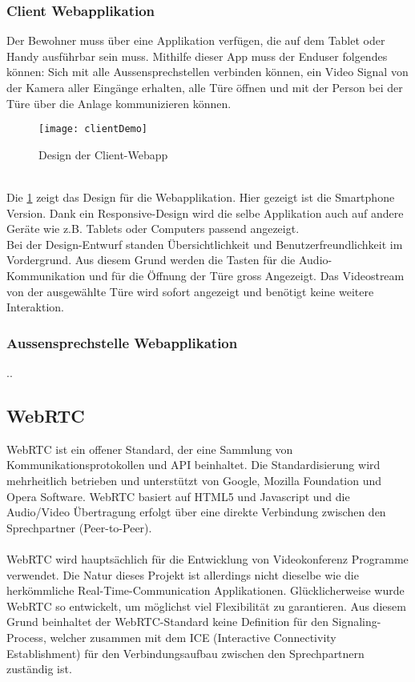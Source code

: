 \subsubsection{Client Webapplikation}
Der Bewohner muss über eine Applikation verfügen, die auf dem Tablet oder Handy ausführbar sein muss. Mithilfe dieser App muss der Enduser folgendes können: Sich mit alle Aussensprechstellen verbinden können, ein Video Signal von der Kamera aller Eingänge erhalten, alle Türe öffnen und mit der Person bei der Türe über die Anlage kommunizieren können.
\\
\begin{figure}[htb!]
	\begin{center}
		\texttt{[image: clientDemo]}
		\caption[Design der Client-Webapp]{Design der Client-Webapp}
		\label{fig:clientDemo}
	\end{center}
\end{figure}
\\
Die \cref{fig:clientDemo} zeigt das Design für die Webapplikation. Hier gezeigt ist die Smartphone Version. Dank ein Responsive-Design wird die selbe Applikation auch auf andere Geräte wie z.B. Tablets oder Computers passend angezeigt.
\\ 
Bei der Design-Entwurf standen Übersichtlichkeit und Benutzerfreundlichkeit im Vordergrund. Aus diesem Grund werden die Tasten für die Audio-Kommunikation und für die Öffnung der Türe gross Angezeigt. Das Videostream von der ausgewählte Türe wird sofort angezeigt und benötigt keine weitere Interaktion. 

\subsubsection{Aussensprechstelle Webapplikation}
..

\subsection{WebRTC}
\label{kap:webrtc}
WebRTC ist ein offener Standard, der eine Sammlung von Kommunikationsprotokollen und API beinhaltet. Die Standardisierung wird mehrheitlich betrieben und unterstützt von Google, Mozilla Foundation und Opera Software. WebRTC basiert auf HTML5 und Javascript und die Audio/Video Übertragung erfolgt über eine direkte Verbindung zwischen den Sprechpartner (Peer-to-Peer).
\\
\\
WebRTC wird hauptsächlich für die Entwicklung von Videokonferenz Programme verwendet. Die Natur dieses Projekt ist allerdings nicht dieselbe wie die herkömmliche Real-Time-Communication Applikationen. Glücklicherweise wurde WebRTC so entwickelt, um möglichst viel Flexibilität zu garantieren. Aus diesem Grund beinhaltet der WebRTC-Standard keine Definition für den Signaling-Process, welcher zusammen mit dem ICE (Interactive Connectivity Establishment) für den Verbindungsaufbau zwischen den Sprechpartnern zuständig ist. 

